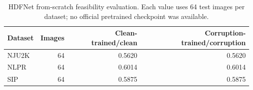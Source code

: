 \begin{table}[t]\centering\caption{HDFNet from-scratch feasibility evaluation. Each value uses 64 test images per dataset; no official pretrained checkpoint was available.}\label{tab:hdfnet_feasibility}\begin{tabular}{lrrr}\toprule Dataset & Images & Clean-trained/clean & Corruption-trained/corruption \\ \midrule
NJU2K & 64 & 0.5620 & 0.5620 \\
NLPR & 64 & 0.6014 & 0.6014 \\
SIP & 64 & 0.5875 & 0.5875 \\
\bottomrule\end{tabular}\end{table}

